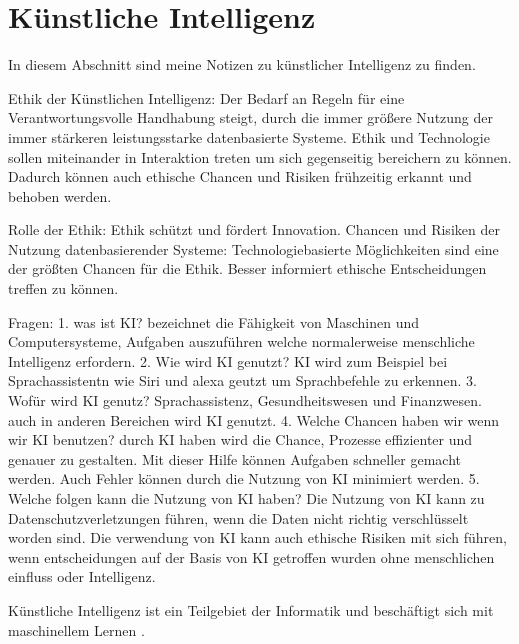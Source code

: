 \section{Künstliche Intelligenz}
\label{sec:ai}

In diesem Abschnitt sind meine Notizen zu künstlicher Intelligenz zu finden.


Ethik der Künstlichen Intelligenz: 
Der Bedarf an Regeln für eine Verantwortungsvolle Handhabung steigt, durch die immer größere Nutzung der immer stärkeren leistungsstarke datenbasierte Systeme. 
Ethik und Technologie sollen miteinander in Interaktion treten um sich gegenseitig bereichern zu können. Dadurch können auch ethische Chancen und Risiken frühzeitig erkannt und behoben werden. 

Rolle der Ethik: 
Ethik schützt und fördert Innovation.
Chancen und Risiken der Nutzung datenbasierender Systeme:
Technologiebasierte Möglichkeiten sind eine der größten Chancen für die Ethik. Besser informiert ethische Entscheidungen treffen zu können.  

Fragen: 
1. was ist KI?
bezeichnet die Fähigkeit von Maschinen und Computersysteme, Aufgaben auszuführen welche normalerweise menschliche Intelligenz erfordern. 
2. Wie wird KI genutzt?
KI wird zum Beispiel bei Sprachassistentn wie Siri und alexa geutzt um Sprachbefehle zu erkennen. 
3. Wofür wird KI genutz? 
Sprachassistenz, Gesundheitswesen und Finanzwesen. auch in anderen Bereichen wird KI genutzt. 
4. Welche Chancen haben wir wenn wir KI benutzen?
durch KI haben wird die Chance, Prozesse effizienter und genauer zu gestalten. Mit dieser Hilfe können Aufgaben
schneller gemacht werden. Auch Fehler können durch die Nutzung von KI minimiert werden. 
5. Welche folgen kann die Nutzung von KI haben?
Die Nutzung von KI kann zu Datenschutzverletzungen führen, wenn die Daten nicht richtig verschlüsselt worden sind. 
Die verwendung von KI kann auch ethische Risiken mit sich führen, wenn entscheidungen auf der Basis von KI getroffen wurden ohne menschlichen einfluss oder Intelligenz. 


Künstliche Intelligenz ist ein Teilgebiet der Informatik und beschäftigt sich mit maschinellem Lernen \citep{ai-wikipedia}.